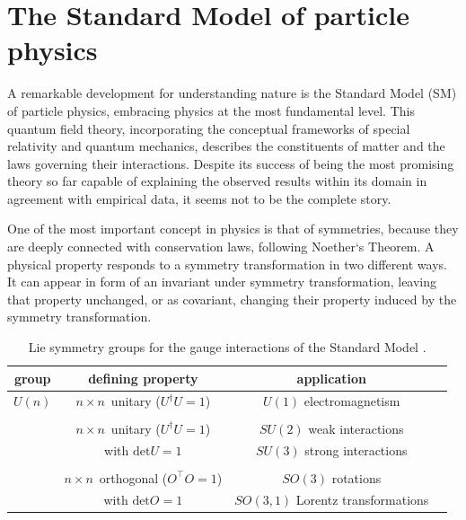 \section{The Standard Model of particle physics}\label{SM}
A remarkable development for understanding nature is the Standard Model (SM) of particle physics, embracing physics at the most fundamental level. This quantum field theory, incorporating the conceptual frameworks of special relativity and quantum mechanics, describes the constituents of matter and the laws governing their interactions. \cite{Mann} Despite its success of being the most promising theory so far capable of explaining the observed results within its domain in agreement with empirical data, it seems not to be the complete story. \cite{Nair}\par
One of the most important concept in physics is that of symmetries, because they are deeply connected with conservation laws, following Noether`s Theorem. A physical property responds to a symmetry transformation in two different ways. It can appear in form of an invariant under symmetry transformation, leaving that property unchanged, or as covariant, changing their property induced by the symmetry transformation. %
\begin{table}[htbp]
		\centering
		\begin{tabular*}{\linewidth}{@{\extracolsep{\fill}}cccc}
		\hline
		\hline
		\rule[-6pt]{0pt}{21pt}\textbf{group}  & \textbf{defining property} & \textbf{application} 
		\\
		\hline
		\rule[-6pt]{0pt}{21pt} $U(n)$ &  $n\times n\,$ unitary ($U^\dagger U=1$)	& $U(1)$ electromagnetism
		\\\\
                \rule[-6pt]{0pt}{21pt} \multirow{2}{*}{ $SU(n)$ } &  $n\times n\,$ unitary ($U^\dagger U=1$) 	& $SU(2)$ weak interactions
		\\
                \rule[-6pt]{0pt}{21pt}  & with $\text{det}U=1$  &  $SU(3)$ strong interactions
		\\\\
                \rule[-6pt]{0pt}{21pt} \multirow{2}{*}{$SO(n)$} & $n\times n\,$ orthogonal ($O^\intercal O=1$)  &  $SO(3)$ rotations
		\\
                \rule[-6pt]{0pt}{21pt}  &  with $\text{det}O=1$ &  $SO(3,1)$ Lorentz transformations
		\\
		\hline
		\hline
		\end{tabular*}
		\caption[Lie symmetry groups of the Standard Model.]{Lie symmetry groups for the gauge interactions of the Standard Model \cite{Mann}.}
		\label{sym}
	\end{table}
